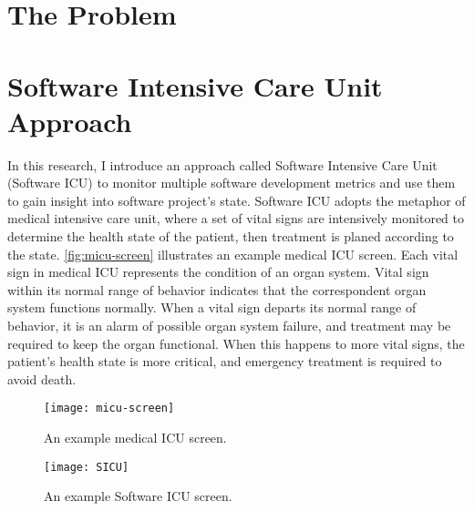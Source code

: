 \section{The Problem}

\section{Software Intensive Care Unit Approach}
In this research, I introduce an approach called Software Intensive Care Unit (Software ICU) to monitor multiple software development metrics and use them to gain insight into software project's state. Software ICU adopts the metaphor of medical intensive care unit, where a set of vital signs are intensively monitored to determine the health state of the patient, then treatment is planed according to the state. \autoref{fig:micu-screen} illustrates an example medical ICU screen. Each vital sign in medical ICU represents the condition of an organ system. Vital sign within its normal range of behavior indicates that the correspondent organ system functions normally. When a vital sign departs its normal range of behavior, it is an alarm of possible organ system failure, and treatment may be required to keep the organ functional. When this happens to more vital signs, the patient's health state is more critical, and emergency treatment is required to avoid death.

\begin{figure}[htbp]
   \centering
   \texttt{[image: micu-screen]}
   \caption{An example medical ICU screen.}
   \label{fig:micu-screen}
\end{figure}

\begin{figure}[htbp]
   \centering
   \texttt{[image: SICU]}
   \caption{An example Software ICU screen.}
   \label{fig:SICU}
\end{figure}


